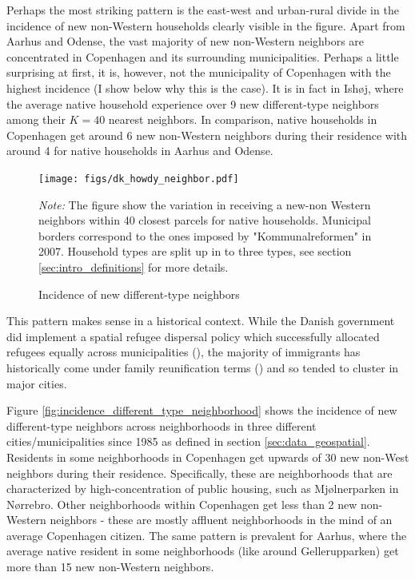 \documentclass[main.tex]{subfiles}
\begin{document}
Perhaps the most striking pattern is the east-west and urban-rural divide in the incidence of new non-Western households clearly visible in the figure. Apart from Aarhus and Odense, the vast majority of new non-Western neighbors are concentrated in Copenhagen and its surrounding municipalities. Perhaps a little surprising at first, it is, however, not the municipality of Copenhagen with the highest incidence (I show below why this is the case). It is in fact in Ishøj, where the average native household experience over 9 new different-type neighbors among their $K=40$ nearest neighbors. In comparison, native households in Copenhagen get around 6 new non-Western neighbors during their residence with around 4 for native households in Aarhus and Odense. 


\begin{figure}[H]
    \centering
    \caption{Incidence of new different-type neighbors}
    \texttt{[image: figs/dk\_howdy\_neighbor.pdf]}
    \label{fig:incidence_different_type_dk}
\begin{tablenotes}
\item \footnotesize \textit{Note:} The figure show the variation in receiving a new-non Western neighbors within 40 closest parcels for native households. Municipal borders correspond to the ones imposed by "Kommunalreformen" in 2007. Household types are split up in to three types, see section \ref{sec:intro_definitions} for more details.
\end{tablenotes}
\end{figure}

This pattern makes sense in a historical context. While the Danish government did implement a spatial refugee dispersal policy which successfully allocated refugees equally across municipalities (\textcite{hasager2024sick_poor_neighborhood}), the majority of immigrants has historically come under family reunification terms (\textcite{dst_hvor_bor_indvandrere}) and so tended to cluster in major cities. 

Figure \ref{fig:incidence_different_type_neighborhood} shows the incidence of new different-type neighbors across neighborhoods in three different cities/municipalities since 1985 as defined in section \ref{sec:data_geospatial}. Residents in some neighborhoods in Copenhagen get upwards of 30 new non-West neighbors during their residence. Specifically, these are neighborhoods that are characterized by high-concentration of public housing, such as Mjølnerparken in Nørrebro. Other neighborhoods within Copenhagen get less than 2 new non-Western neighbors - these are mostly affluent neighborhoods in the mind of an average Copenhagen citizen. The same pattern is prevalent for Aarhus, where the average native resident in some neighborhoods (like around Gellerupparken) get more than 15 new non-Western neighbors.
\end{document}
